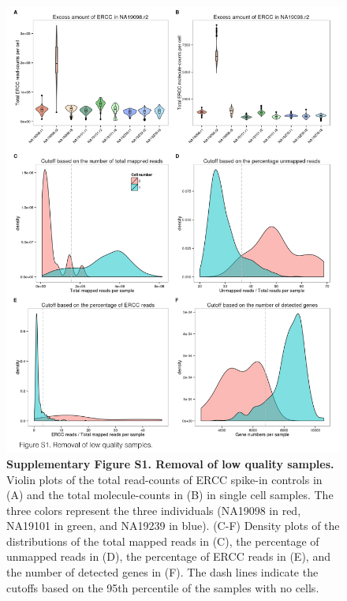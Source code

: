 \begin{figure}[htbp]
\centering
\includegraphics[width=5in]{img/ch04/Figure06.jpeg}
\caption{\textbf{Supplementary Figure S1. Removal of low quality
samples.} Violin plots of the total read-counts of ERCC spike-in
controls in (A) and the total molecule-counts in (B) in single cell
samples. The three colors represent the three individuals (NA19098 in
red, NA19101 in green, and NA19239 in blue). (C-F) Density plots of the
distributions of the total mapped reads in (C), the percentage of
unmapped reads in (D), the percentage of ERCC reads in (E), and the
number of detected genes in (F). The dash lines indicate the cutoffs
based on the 95th percentile of the samples with no cells.}
\end{figure}

